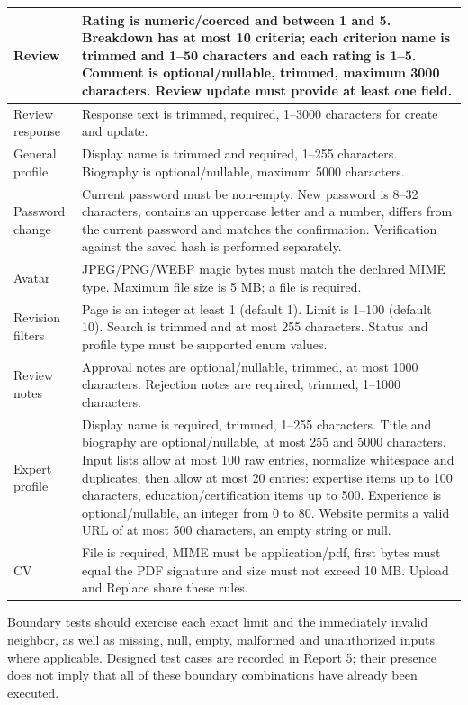 {\begin{longtable}{|L{3.3cm}|L{10.8cm}|}
Review & Rating is numeric/coerced and between 1 and 5. Breakdown has at most 10 criteria; each criterion name is trimmed and 1--50 characters and each rating is 1--5. Comment is optional/nullable, trimmed, maximum 3000 characters. Review update must provide at least one field. \\ \hline
Review response & Response text is trimmed, required, 1--3000 characters for create and update. \\ \hline
General profile & Display name is trimmed and required, 1--255 characters. Biography is optional/nullable, maximum 5000 characters. \\ \hline
Password change & Current password must be non-empty. New password is 8--32 characters, contains an uppercase letter and a number, differs from the current password and matches the confirmation. Verification against the saved hash is performed separately. \\ \hline
Avatar & JPEG/PNG/WEBP magic bytes must match the declared MIME type. Maximum file size is 5 MB; a file is required. \\ \hline
Revision filters & Page is an integer at least 1 (default 1). Limit is 1--100 (default 10). Search is trimmed and at most 255 characters. Status and profile type must be supported enum values. \\ \hline
Review notes & Approval notes are optional/nullable, trimmed, at most 1000 characters. Rejection notes are required, trimmed, 1--1000 characters. \\ \hline
Expert profile & Display name is required, trimmed, 1--255 characters. Title and biography are optional/nullable, at most 255 and 5000 characters. Input lists allow at most 100 raw entries, normalize whitespace and duplicates, then allow at most 20 entries: expertise items up to 100 characters, education/certification items up to 500. Experience is optional/nullable, an integer from 0 to 80. Website permits a valid URL of at most 500 characters, an empty string or null. \\ \hline
CV & File is required, MIME must be application/pdf, first bytes must equal the PDF signature and size must not exceed 10 MB. Upload and Replace share these rules. \\ \hline
\end{longtable}}

Boundary tests should exercise each exact limit and the immediately invalid
neighbor, as well as missing, null, empty, malformed and unauthorized inputs
where applicable. Designed test cases are recorded in Report 5; their presence
does not imply that all of these boundary combinations have already been executed.
